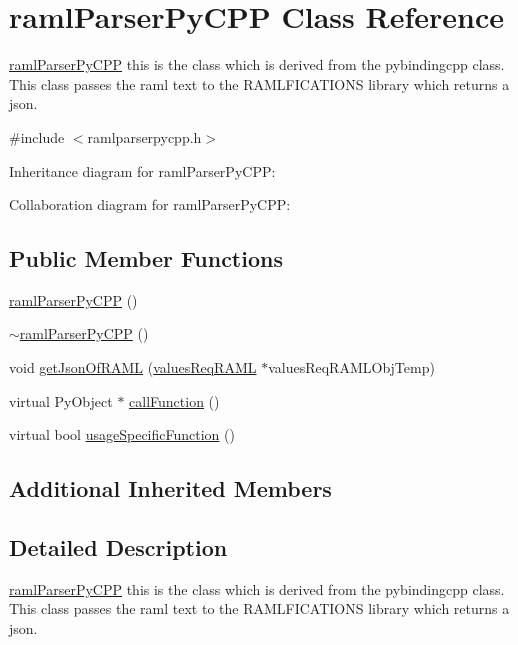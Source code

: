 \hypertarget{classramlParserPyCPP}{}\section{raml\+Parser\+Py\+C\+PP Class Reference}
\label{classramlParserPyCPP}


\hyperlink{classramlParserPyCPP}{raml\+Parser\+Py\+C\+PP} this is the class which is derived from the pybindingcpp class. This class passes the raml text to the R\+A\+M\+L\+F\+I\+C\+A\+T\+I\+O\+NS library which returns a json.  




{\ttfamily \#include $<$ramlparserpycpp.\+h$>$}



Inheritance diagram for raml\+Parser\+Py\+C\+PP\+:


Collaboration diagram for raml\+Parser\+Py\+C\+PP\+:
\subsection*{Public Member Functions}
\begin{DoxyCompactItemize}
\item 
\hyperlink{classramlParserPyCPP_a3debcf503c5464028a0f52ad439050d7}{raml\+Parser\+Py\+C\+PP} ()
\item 
\hyperlink{classramlParserPyCPP_adea2989c31c5b5b876176ae256e6d38f}{$\sim$raml\+Parser\+Py\+C\+PP} ()
\item 
void \hyperlink{classramlParserPyCPP_a88148a5ac7cde2c4750cd2b7bedf76e3}{get\+Json\+Of\+R\+A\+ML} (\hyperlink{structvaluesReqRAML}{values\+Req\+R\+A\+ML} $\ast$values\+Req\+R\+A\+M\+L\+Obj\+Temp)
\item 
virtual Py\+Object $\ast$ \hyperlink{classramlParserPyCPP_a7ab09f4772eea48dadc6b8e2240289d9}{call\+Function} ()
\item 
virtual bool \hyperlink{classramlParserPyCPP_a3950e96ca7bba7f8dd9bac4fe02b698c}{usage\+Specific\+Function} ()
\end{DoxyCompactItemize}
\subsection*{Additional Inherited Members}


\subsection{Detailed Description}
\hyperlink{classramlParserPyCPP}{raml\+Parser\+Py\+C\+PP} this is the class which is derived from the pybindingcpp class. This class passes the raml text to the R\+A\+M\+L\+F\+I\+C\+A\+T\+I\+O\+NS library which returns a json. 

